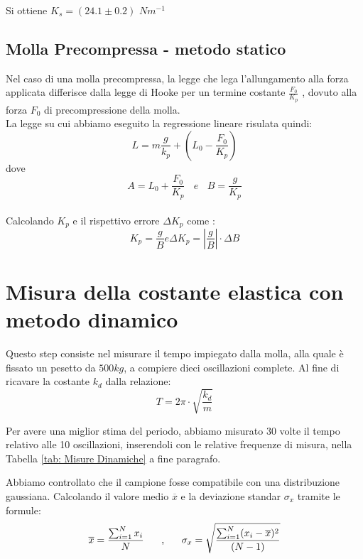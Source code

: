 \documentclass[12pt, a4paper]{article}
\begin{document}
Si ottiene $K_s = (24.1 \pm 0.2)$ $N m^{-1}$






\subsection{Molla Precompressa - metodo statico}
Nel caso di una molla precompressa, la legge che lega l'allungamento alla forza applicata differisce dalla legge di Hooke per un termine costante $\frac{F_0}{K_p}$ , dovuto alla forza $F_0$ di precompressione della molla.  
\\La legge su cui abbiamo eseguito la regressione lineare risulata quindi: 
\begin{equation}
    L = m \frac{g}{k_p} + (L_0 - \frac{F_0}{K_p}) 
\end{equation}
dove 
\begin{equation}
    A = L_0 + \frac{F_0}{K_p} \  \ \ \   e   \ \ \ \ B = \frac{g}{K_p}
\end{equation}
\\Calcolando $K_p$ e il rispettivo errore $\Delta K_p$ come : 
\begin{equation}
    K_p = \frac{g}{B} e \Delta K_p = \left | \frac{g}{B}  \right | \cdot \Delta B 
\end{equation}






\section{Misura della costante elastica con metodo dinamico }
Questo step consiste nel misurare il tempo impiegato dalla molla, alla quale è fissato un pesetto da $500kg$, a compiere dieci oscillazioni complete. Al fine di ricavare la costante $k_d$ dalla relazione: 
\begin{equation}
    T = 2\pi \cdot \sqrt{\frac{k_d}{m}}
\end{equation} 

Per avere una miglior stima del periodo, abbiamo misurato 30  volte il tempo relativo alle 10 oscillazioni, inserendoli con le relative frequenze di misura, nella Tabella \ref{tab: Misure Dinamiche} a fine paragrafo.  

Abbiamo controllato che il campione fosse compatibile con una distribuzione gaussiana.
Calcolando il valore medio $\overline{x}$ e la deviazione standar $\sigma_x$ tramite le formule: 
\begin{equation}
    \overline{x} = \frac{\sum_{i=1}^{N}x_i}{N} \mbox{\hspace{0.5cm} , \hspace{0.5cm}}
    \sigma_x = \sqrt{\frac{\sum_{i=1}^{N}(x_i-\overline{x})^2}{(N-1)}}
\end{equation}
\end{document}
